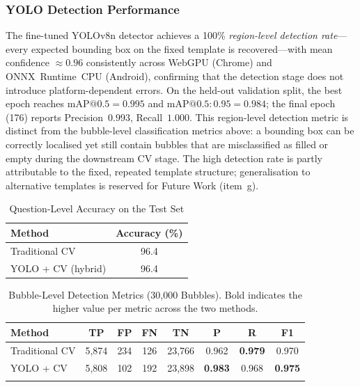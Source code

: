 \documentclass[conference]{IEEEtran}
\begin{document}
\subsubsection{YOLO Detection Performance}

The fine-tuned YOLOv8n detector achieves a 100\% \emph{region-level
detection rate}---every expected bounding box on the fixed template
is recovered---with mean confidence $\approx0.96$ consistently across
WebGPU (Chrome) and ONNX~Runtime~CPU (Android), confirming that the
detection stage does not introduce platform-dependent errors.
On the held-out validation split, the best epoch reaches
$\mathrm{mAP}@0.5{=}0.995$ and
$\mathrm{mAP}@0.5{:}0.95{=}\mathbf{0.984}$; the final epoch (176)
reports Precision~$0.993$, Recall~$1.000$.
This region-level detection metric is distinct from the bubble-level
classification metrics above: a bounding box can be correctly
localised yet still contain bubbles that are misclassified as filled
or empty during the downstream CV stage.
The high detection rate is partly attributable to the fixed,
repeated template structure; generalisation to alternative templates
is reserved for Future Work (item~g).

\begin{table}[t]
\caption{Question-Level Accuracy on the Test Set}
\label{tab:accuracy}
\centering
\begin{tabular}{lc}
\toprule
\textbf{Method} & \textbf{Accuracy (\%)} \\
\midrule
Traditional CV       & 96.4 \\
YOLO + CV (hybrid)   & 96.4 \\
\bottomrule
\end{tabular}
\end{table}
\begin{table}[t]
\caption{Bubble-Level Detection Metrics (30,000 Bubbles). Bold indicates the higher value per metric across the two methods.}
\label{tab:confusion}
\centering
\setlength{\tabcolsep}{3.5pt}
\begin{tabular}{lccccccc}
\toprule{}
\textbf{Method} & \textbf{TP} & \textbf{FP} & \textbf{FN} & \textbf{TN} & \textbf{P} & \textbf{R} & \textbf{F1} \\
\midrule{}
Traditional CV & 5,874 & 234 & 126 & 23,766 & 0.962          & \textbf{0.979} & 0.970          \\
YOLO + CV      & 5,808 & 102 & 192 & 23,898 & \textbf{0.983} & 0.968          & \textbf{0.975} \\
\bottomrule{}
\end{tabular}
\end{table}
\end{document}
